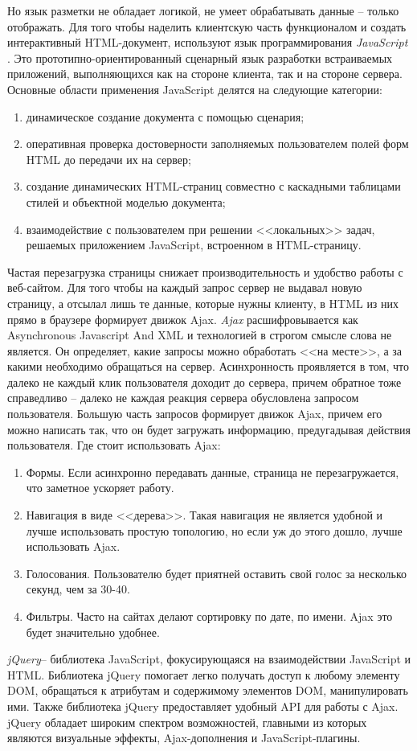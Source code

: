 Но язык разметки не обладает логикой, не умеет обрабатывать данные -- только отображать. Для того чтобы наделить клиентскую часть функционалом и создать интерактивный HTML-документ, используют язык программирования {\itshape JavaScript }. Это прототипно-ориентированный сценарный язык разработки встраиваемых приложений, выполняющихся как на стороне клиента, так и на стороне сервера\cite{php}.
Основные области применения JavaScript делятся на следующие категории:
\begin{enumerate}
\item динамическое создание документа с помощью сценария;
\item оперативная проверка достоверности заполняемых пользователем полей форм HTML до передачи их на сервер;
\item создание динамических HTML-страниц совместно с каскадными таблицами стилей и объектной моделью документа;
\item взаимодействие с пользователем при решении <<локальных>> задач, решаемых приложением JavaScript, встроенном в HTML-страницу.
\end{enumerate}

Частая перезагрузка страницы снижает производительность и удобство работы с веб-сайтом. Для того чтобы на каждый запрос сервер не выдавал новую страницу, а отсылал лишь те данные, которые нужны клиенту, в HTML из них прямо в браузере формирует движок Ajax.
{\itshape Ajax } расшифровывается как Asynchronous Javascript And XML и технологией в строгом смысле слова не является. Он определяет, какие запросы можно обработать <<на месте>>, а за какими необходимо обращаться на сервер. Асинхронность проявляется в том, что далеко не каждый клик пользователя доходит до сервера, причем обратное тоже справедливо -- далеко не каждая реакция сервера обусловлена запросом пользователя. Большую часть запросов формирует движок Ajax, причем его можно написать так, что он будет загружать информацию, предугадывая действия пользователя\cite{php}.
Где стоит использовать Ajax:
\begin{enumerate}
\item Формы. Если асинхронно передавать данные, страница не перезагружается, что заметное ускоряет работу.
\item Навигация в виде <<дерева>>. Такая навигация не является удобной и лучше использовать простую топологию, но если уж до этого дошло, лучше использовать Ajax.
\item Голосования. Пользователю будет приятней оставить свой голос за несколько секунд, чем за 30-40.
\item Фильтры. Часто на сайтах делают сортировку по дате, по имени. Ajax это будет значительно удобнее.
\end{enumerate}
 
{\itshape jQuery}-- библиотека JavaScript, фокусирующаяся на взаимодействии JavaScript и HTML. Библиотека jQuery помогает легко получать доступ к любому элементу DOM, обращаться к атрибутам и содержимому элементов DOM, манипулировать ими. Также библиотека jQuery предоставляет удобный API для работы с Ajax. jQuery обладает широким спектром возможностей, главными из которых являются визуальные эффекты, Ajax-дополнения и JavaScript-плагины\cite{php}.

\clearpage